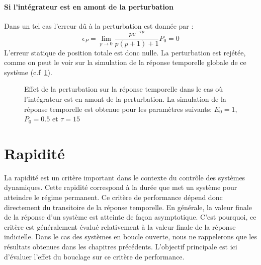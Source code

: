 \paragraph{Si l'intégrateur est en amont de la perturbation}
Dans un tel cas l'erreur dû à la perturbation est donnée par :
\[
\epsilon_P=\lim\limits_{p\to0}\dfrac{pe^{-\tau p}}{p(p+1)+1}P_0=0
\]
L'erreur statique de position totale est donc nulle. La perturbation
est rejétée, comme on peut le voir sur la simulation de la réponse
temporelle globale de ce système (c.f~\cref{fig-pert2}).
\begin{figure}[!h]
    \centering
    
    \caption{Effet de la perturbation sur la réponse temporelle dans le cas
             où l'intégrateur est en amont de la perturbation. La simulation
             de la réponse temporelle est obtenue pour les paramètres suivants: 
             $E_0=1$, $P_0=0.5$ et $\tau=15$\label{fig-pert2}}
\end{figure}
\clearpage
\section{Rapidité\label{sec-rapidite}}
La rapidité est un critère important dans le contexte du contrôle des 
systèmes dynamiques. Cette rapidité correspond à la durée que met un 
système pour atteindre le régime permanent. Ce critère de performance 
dépend donc directement du transitoire de la réponse temporelle. 
En générale, la valeur finale de la réponse d'un système est atteinte de 
façon asymptotique. C'est pourquoi, ce critère est généralement évalué 
relativement à la valeur finale de la réponse indicielle. 
Dans le cas des systèmes en boucle ouverte, nous ne rappelerons que les 
résultats obtenues dans les chapitres précédents. 
L'objectif principale est ici d'évaluer l'effet du bouclage sur ce critère 
de performance.
